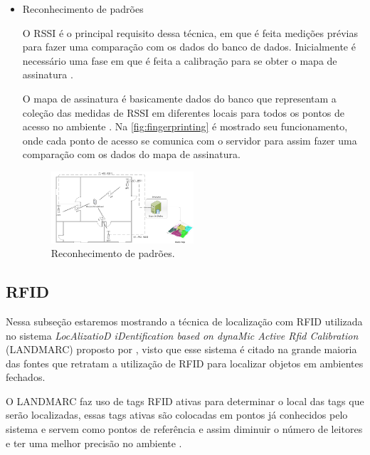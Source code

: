 \begin{itemize}
        \item {Reconhecimento de padrões }
        \par
        O RSSI é o principal requisito dessa técnica, em que é feita medições prévias para fazer uma comparação com os dados do banco de dados. Inicialmente é necessário uma fase em que é feita a calibração para se obter o mapa de assinatura \cite{wifiFernandes}.
        
        \par
        O mapa de assinatura é basicamente dados do banco que representam a coleção das medidas de RSSI em diferentes locais para todos os pontos de acesso no ambiente \cite{wifiFernandes}. Na \autoref{fig:fingerprinting} é mostrado seu funcionamento, onde cada ponto de acesso se comunica com o servidor para assim fazer uma comparação com os dados do mapa de assinatura.
         \begin{figure}[H]
              \caption{\label{fig:fingerprinting}{Reconhecimento de padrões.}}
              \centering
              \includegraphics[width=0.5\textwidth]{Figuras/fingerprinting.PNG}
        \end{figure}
    \end{itemize}

    \subsection{RFID}
    \par
    Nessa subseção estaremos mostrando a técnica de localização com RFID utilizada no sistema \textit{LocAlizatioD iDentification based on dynaMic Active Rfid Calibration} (LANDMARC) proposto por \citeauthor{landmarc}, visto que esse sistema é citado na grande maioria das fontes que retratam a utilização de RFID para localizar objetos em ambientes fechados.
    
    \par
    O LANDMARC faz uso de tags RFID ativas para determinar o local das tags que serão localizadas, essas tags ativas são colocadas em pontos já conhecidos pelo sistema e servem como pontos de referência e assim diminuir o número de leitores e ter uma melhor precisão no ambiente \cite{RFIDapplicationsTechniques}.
    
